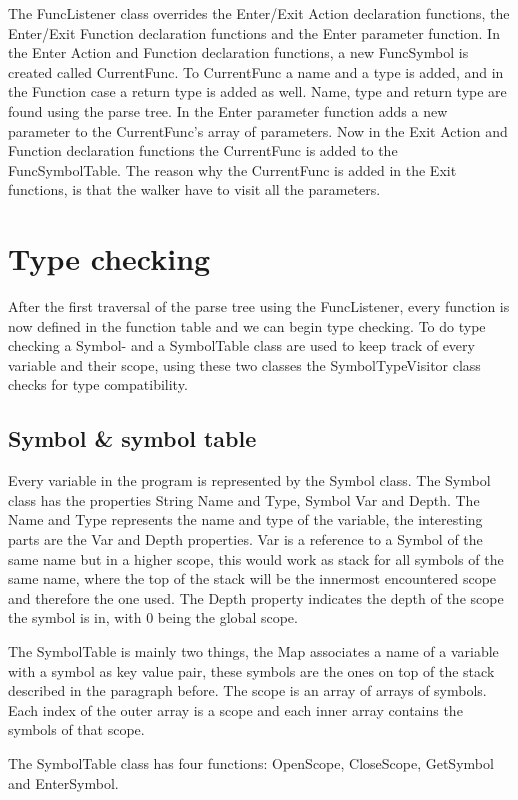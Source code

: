 The FuncListener class overrides the Enter/Exit Action declaration functions, the Enter/Exit Function declaration functions and the Enter parameter function. In the Enter Action and Function declaration functions, a new FuncSymbol is created called CurrentFunc. To CurrentFunc a name and a type is added, and in the Function case a return type is added as well. Name, type and return type are found using the parse tree.
In the Enter parameter function adds a new parameter to the CurrentFunc's array of parameters. 
Now in the Exit Action and Function declaration functions the CurrentFunc is added to the FuncSymbolTable. 
The reason why the CurrentFunc is added in the Exit functions, is that the walker have to visit all the parameters. 

\section{Type checking} 
After the first traversal of the parse tree using the FuncListener, every function is now defined in the function table and we can begin type checking. To do type checking a Symbol- and a SymbolTable class are used to keep track of every variable and their scope, using these two classes the SymbolTypeVisitor class checks for type compatibility. 

\subsection{Symbol \& symbol table}
Every variable in the program is represented by the Symbol class. The Symbol class has the properties String Name and Type, Symbol Var and Depth. The Name and Type represents the name and type of the variable, the interesting parts are the Var and Depth properties. Var is a reference to a Symbol of the same name but in a higher scope, this would work as stack for all symbols of the same name, where the top of the stack will be the innermost encountered scope and therefore the one used. The Depth property indicates the depth of the scope the symbol is in, with 0 being the global scope. 

The SymbolTable is mainly two things, the Map associates a name of a variable with a symbol as key value pair, these symbols are the ones on top of the stack described in the paragraph before. The scope is an array of arrays of symbols. Each index of the outer array is a scope and each inner array contains the symbols of that scope. 

The SymbolTable class has four functions: OpenScope, CloseScope, GetSymbol and EnterSymbol. 

